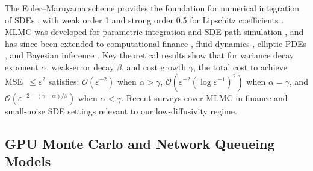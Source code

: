 \documentclass[journal]{IEEEtran}
\begin{document}
The Euler--Maruyama scheme provides the foundation for numerical integration of SDEs
\cite{kloeden1992}, with weak order 1 and strong order 0.5 for Lipschitz coefficients
\cite{khasminskii2012}. MLMC was developed for parametric integration
\cite{heinrich2001multilevel} and SDE path simulation \cite{giles2008multilevel}, and has since
been extended to computational finance \cite{giles2012finance,glasserman2003monte}, fluid
dynamics \cite{mishra2012sparse}, elliptic PDEs \cite{cliffe2015}, and Bayesian inference
\cite{dodwell2015hierarchical}. Key theoretical results \cite{giles2015multilevel} show that for variance decay exponent
$\alpha$, weak-error decay $\beta$, and cost growth $\gamma$, the total cost to achieve
MSE~$\leq\varepsilon^2$ satisfies: $\mathcal{O}(\varepsilon^{-2})$ when $\alpha>\gamma$,
$\mathcal{O}(\varepsilon^{-2}(\log\varepsilon^{-1})^2)$ when $\alpha=\gamma$, and
$\mathcal{O}(\varepsilon^{-2-(\gamma-\alpha)/\beta})$ when $\alpha<\gamma$.
Recent surveys cover MLMC in
finance \cite{giles2024review} and small-noise SDE settings
\cite{spiliopoulos2022multilevel} relevant to our low-diffusivity regime.

\subsection{GPU Monte Carlo and Network Queueing Models}

\begin{table}[!t]
\caption{GPU-Accelerated Monte Carlo Methods in Literature}
\label{tab:gpu_lit}
\centering\scriptsize
{}
\end{table}
\end{document}
